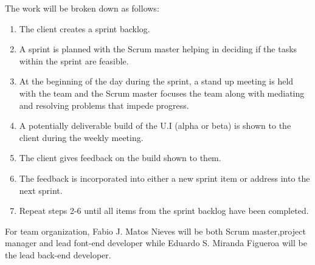  The work will be broken down as follows:
 \begin{enumerate}
 \item The client creates a sprint backlog.
 \item A sprint is planned with the Scrum master helping in deciding if the tasks within the sprint are feasible.
 \item At the beginning of the day during the sprint, a stand up meeting is held with the team and the Scrum master focuses the team along with mediating and resolving problems that impede progress.
 \item A potentially deliverable build of the U.I (alpha or beta) is shown to the client during the weekly meeting.
 \item The client gives feedback on the build shown to them.
 \item The feedback is incorporated into either a new sprint item or address into the next sprint.
 \item Repeat steps 2-6 until all items from the sprint backlog have been completed.
 \end{enumerate}
 For team organization, Fabio J. Matos Nieves will be both Scrum master,project manager and lead font-end developer while Eduardo S. Miranda Figueroa will be the lead back-end developer.